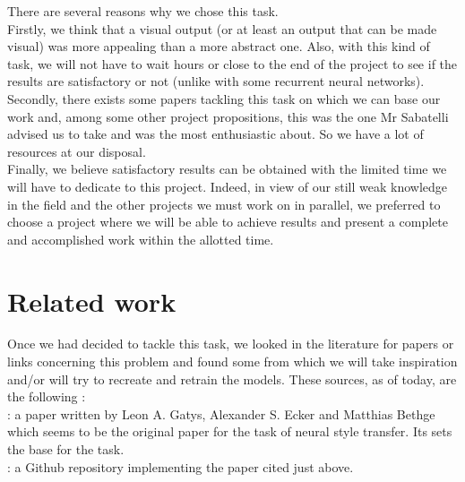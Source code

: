 \documentclass[twocolumn,superscriptaddress,aps]{revtex4-1}
\begin{document}
    There are several reasons why we chose this task.\\
    
    Firstly, we think that a visual output (or at least an output that can be made visual) was more appealing than a more abstract one. Also, with this kind of task, we will not have to wait hours or close to the end of the project to see if the results are satisfactory or not (unlike with some recurrent neural networks).\\
    
    Secondly, there exists some papers tackling this task on which we can base our work and, among some other project propositions, this was the one Mr Sabatelli advised us to take and was the most enthusiastic about. So we have a lot of resources at our disposal.\\
    
    Finally, we believe satisfactory results can be obtained with the limited time we will have to dedicate to this project. Indeed, in view of our still weak knowledge in the field and the other projects we must work on in parallel, we preferred to choose a project where we will be able to achieve results and present a complete and accomplished work within the allotted time.\\
    
    
    
    
    \section{Related work}
    
    Once we had decided to tackle this task, we looked in the literature for papers or links concerning this problem and found some from which we will take inspiration and/or will try to recreate and retrain the models. These sources, as of today, are the following : \\
    
    \cite{1508-06576} : a paper written by Leon A. Gatys, Alexander S. Ecker and Matthias Bethge which seems to be the original paper for the task of neural style transfer. Its sets the base for the task.\\
    
    \cite{github-neural-style-transfer} : a Github repository implementing the paper cited just above.\\
    
\end{document}
